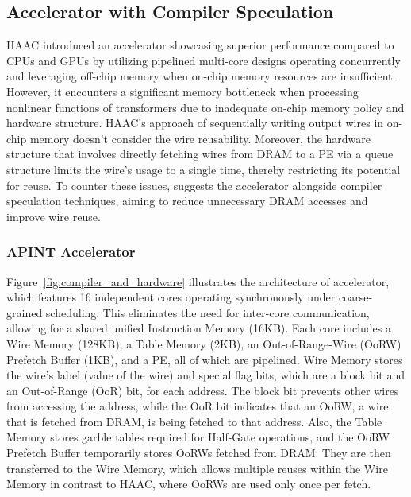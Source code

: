 \subsection{Accelerator with Compiler Speculation}
HAAC introduced an accelerator showcasing superior performance compared to CPUs and GPUs by utilizing pipelined multi-core designs operating concurrently and leveraging off-chip memory when on-chip memory resources are insufficient. However, it encounters a significant memory bottleneck when processing nonlinear functions of transformers due to inadequate on-chip memory policy and hardware structure.
HAAC's approach of sequentially writing output wires in on-chip memory doesn't consider the wire reusability. Moreover, the hardware structure that involves directly fetching wires from DRAM to a PE via a queue structure limits the wire's usage to a single time, thereby restricting its potential for reuse. To counter these issues, \sysname suggests the accelerator alongside compiler speculation techniques, aiming to reduce unnecessary DRAM accesses and improve wire reuse.

\subsubsection{\textbf{APINT Accelerator}}
Figure~\ref{fig:compiler_and_hardware} illustrates the architecture of \sysname accelerator, which features 16 independent cores operating synchronously under coarse-grained scheduling. This eliminates the need for inter-core communication, allowing for a shared unified Instruction Memory (16KB). Each core includes a Wire Memory (128KB), a Table Memory (2KB), an Out-of-Range-Wire (OoRW) Prefetch Buffer (1KB), and a PE, all of which are pipelined.
Wire Memory stores the wire's label (value of the wire) and special flag bits, which are a block bit and an Out-of-Range (OoR) bit, for each address. The block bit prevents other wires from accessing the address, while the OoR bit indicates that an OoRW, a wire that is fetched from DRAM, is being fetched to that address. Also, the Table Memory stores garble tables required for Half-Gate operations, and the OoRW Prefetch Buffer temporarily stores OoRWs fetched from DRAM. They are then transferred to the Wire Memory, which allows multiple reuses within the Wire Memory in contrast to HAAC, where OoRWs are used only once per fetch.


